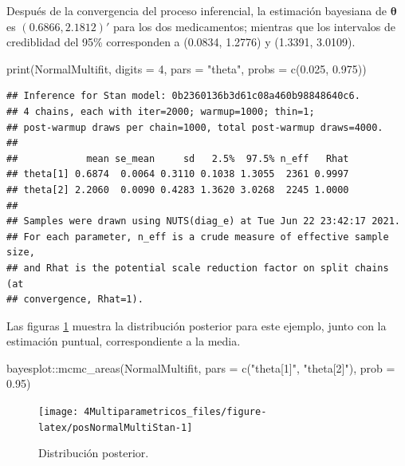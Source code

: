 \documentclass[
  10pt,
  spanish,
]{book}
\newenvironment{Shaded}{\begin{snugshade}}{\end{snugshade}}
\newcommand{\AttributeTok}[1]{\textcolor[rgb]{0.77,0.63,0.00}{#1}}
\newcommand{\DecValTok}[1]{\textcolor[rgb]{0.00,0.00,0.81}{#1}}
\newcommand{\FloatTok}[1]{\textcolor[rgb]{0.00,0.00,0.81}{#1}}
\newcommand{\FunctionTok}[1]{\textcolor[rgb]{0.00,0.00,0.00}{#1}}
\newcommand{\NormalTok}[1]{#1}
\newcommand{\SpecialCharTok}[1]{\textcolor[rgb]{0.00,0.00,0.00}{#1}}
\newcommand{\StringTok}[1]{\textcolor[rgb]{0.31,0.60,0.02}{#1}}
\theoremstyle{definition}
\theoremstyle{definition}
\theoremstyle{definition}
\theoremstyle{definition}
\theoremstyle{remark}
\begin{document}
Después de la convergencia del proceso inferencial, la estimación bayesiana de \(\boldsymbol \theta\) es \((0.6866, 2.1812)'\) para los dos medicamentos; mientras que los intervalos de crediblidad del 95\% corresponden a (0.0834, 1.2776) y (1.3391, 3.0109).

\begin{Shaded}
\begin{Highlighting}[]
\FunctionTok{print}\NormalTok{(NormalMultifit, }\AttributeTok{digits =} \DecValTok{4}\NormalTok{, }
      \AttributeTok{pars =} \StringTok{"theta"}\NormalTok{, }\AttributeTok{probs =} \FunctionTok{c}\NormalTok{(}\FloatTok{0.025}\NormalTok{, }\FloatTok{0.975}\NormalTok{))}
\end{Highlighting}
\end{Shaded}

\begin{verbatim}
## Inference for Stan model: 0b2360136b3d61c08a460b98848640c6.
## 4 chains, each with iter=2000; warmup=1000; thin=1; 
## post-warmup draws per chain=1000, total post-warmup draws=4000.
## 
##            mean se_mean     sd   2.5%  97.5% n_eff   Rhat
## theta[1] 0.6874  0.0064 0.3110 0.1038 1.3055  2361 0.9997
## theta[2] 2.2060  0.0090 0.4283 1.3620 3.0268  2245 1.0000
## 
## Samples were drawn using NUTS(diag_e) at Tue Jun 22 23:42:17 2021.
## For each parameter, n_eff is a crude measure of effective sample size,
## and Rhat is the potential scale reduction factor on split chains (at 
## convergence, Rhat=1).
\end{verbatim}

Las figuras \ref{fig:posNormalMultiStan} muestra la distribución posterior para este ejemplo, junto con la estimación puntual, correspondiente a la media.

\begin{Shaded}
\begin{Highlighting}[]
\NormalTok{bayesplot}\SpecialCharTok{::}\FunctionTok{mcmc\_areas}\NormalTok{(NormalMultifit, }\AttributeTok{pars =} \FunctionTok{c}\NormalTok{(}\StringTok{"theta[1]"}\NormalTok{, }\StringTok{"theta[2]"}\NormalTok{), }
                      \AttributeTok{prob =} \FloatTok{0.95}\NormalTok{)}
\end{Highlighting}
\end{Shaded}

\begin{figure}

{\centering \texttt{[image: 4Multiparametricos\_files/figure-latex/posNormalMultiStan-1]} 

}

\caption{Distribución posterior.}\label{fig:posNormalMultiStan}
\end{figure}
\end{document}
